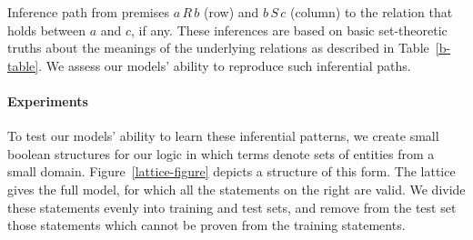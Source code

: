 
\begin{table}[htp]
  \centering  
  \setlength{\arraycolsep}{8pt}
  \renewcommand{\arraystretch}{1.1}
  \newcommand{\UNK}{\cdot}  
  \resizebox{2.2in}{!}{$\begin{array}[t]{c@{ \ }|*{7}{c}|}
    \multicolumn{1}{c}{}
             & \nateq     & \natfor     & \natrev     & \natneg    & \natalt     & \natcov     & \multicolumn{1}{c}{\natind} \\
    \cline{2-8}
    \nateq  & \nateq &   \natfor &  \natrev &  \natneg &   \natalt &  \natcov &  \natind \\
    \natfor & \natfor &  \natfor &  \UNK &  \natalt &   \natalt &  \UNK &  \UNK \\
    \natrev & \natrev &  \UNK &  \natrev &  \natcov &   \UNK &  \natcov &  \UNK \\
    \natneg & \natneg &  \natcov &  \natalt &  \nateq &    \natrev &  \natfor &  \natind \\
    \natalt & \natalt &  \UNK &  \natalt &  \natfor &   \UNK &  \natfor &  \UNK \\
    \natcov & \natcov &  \natcov &  \UNK &  \natrev &   \natrev &  \UNK &  \UNK \\
    \natind & \natind & \UNK &  \UNK &  \natind &  \UNK &  \UNK &  \UNK \\
    \cline{2-8}
  \end{array}$}
  \caption{Inference path from premises $a\,R\,b$ (row) and $b\,S\,c$ (column) to the relation that holds between $a$ and $c$, if any.  These inferences are based on basic set-theoretic truths about the meanings of the underlying relations as described in Table~\ref{b-table}. We assess our models' ability to reproduce such inferential paths.}
  \label{tab:jointable}
\end{table}

\paragraph{Experiments}
To test our models' ability to learn these inferential patterns, we
create small boolean structures for our logic in which terms denote
sets of entities from a small domain.  Figure~\ref{lattice-figure}
depicts a structure of this form. The lattice gives the full model,
for which all the statements on the right are valid. We divide these
statements evenly into training and test sets, and remove from the
test set those statements which cannot be proven from the training
statements.


